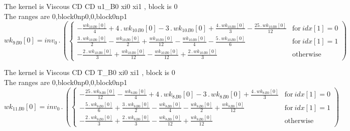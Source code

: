 \documentclass{article}
\begin{document}
\noindent The kernel is Viscous CD CD u1_B0 xi0 xi1 , block is 0\\\noindent The ranges are 0,block0np0,0,block0np1\\\begin{dmath}{wk_{9}{_{B0}}}[{0}] = inv_0 \,.\, \left(\begin{cases} - \frac{{wk_{10}{_{B0}}}[{0}]}{4} + 4 \,.\, {wk_{10}{_{B0}}}[{0}] - 3 \,.\, {wk_{10}{_{B0}}}[{0}] + \frac{4 \,.\, {wk_{10}{_{B0}}}[{0}]}{3} - \frac{25 \,.\, 
{wk_{10}{_{B0}}}[{0}]}{12} & \text{for}\: {idx}[{1}] = 0 \\\frac{3 \,.\, {wk_{10}{_{B0}}}[{0}]}{2} - \frac{{wk_{10}{_{B0}}}[{0}]}{2} + \frac{{wk_{10}{_{B0}}}[{0}]}{12} - \frac{{wk_{10}{_{B0}}}[{0}]}{4} - \frac{5 \,.\, {wk_{10}{_{B0}}}[{0}]}{6} & 
\text{for}\: {idx}[{1}] = 1 \\- \frac{2 \,.\, {wk_{10}{_{B0}}}[{0}]}{3} + \frac{{wk_{10}{_{B0}}}[{0}]}{12} - \frac{{wk_{10}{_{B0}}}[{0}]}{12} + \frac{2 \,.\, {wk_{10}{_{B0}}}[{0}]}{3} & \text{otherwise} \end{cases}\right)\end{dmath}

\noindent The kernel is Viscous CD CD T_B0 xi0 xi1 , block is 0\\\noindent The ranges are 0,block0np0,0,block0np1\\\begin{dmath}{wk_{11}{_{B0}}}[{0}] = inv_0 \,.\, \left(\begin{cases} - \frac{25 \,.\, {wk_{8}{_{B0}}}[{0}]}{12} - \frac{{wk_{8}{_{B0}}}[{0}]}{4} + 4 \,.\, {wk_{8}{_{B0}}}[{0}] - 3 \,.\, {wk_{8}{_{B0}}}[{0}] + \frac{4 \,.\, {wk_{8}{_{B0}}}[{0}]}{3} & 
\text{for}\: {idx}[{1}] = 0 \\- \frac{5 \,.\, {wk_{8}{_{B0}}}[{0}]}{6} + \frac{3 \,.\, {wk_{8}{_{B0}}}[{0}]}{2} - \frac{{wk_{8}{_{B0}}}[{0}]}{4} - \frac{{wk_{8}{_{B0}}}[{0}]}{2} + \frac{{wk_{8}{_{B0}}}[{0}]}{12} & \text{for}\: {idx}[{1}] = 1 \\- 
\frac{2 \,.\, {wk_{8}{_{B0}}}[{0}]}{3} + \frac{2 \,.\, {wk_{8}{_{B0}}}[{0}]}{3} - \frac{{wk_{8}{_{B0}}}[{0}]}{12} + \frac{{wk_{8}{_{B0}}}[{0}]}{12} & \text{otherwise} \end{cases}\right)\end{dmath}
\end{document}
